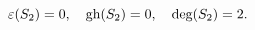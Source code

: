 \begin{equation}\label{4.14a}
\varepsilon(S_2)=0,\quad \hbox{gh}(S_2)=0,\quad \hbox{deg}(S_2)=2.
\end{equation}

